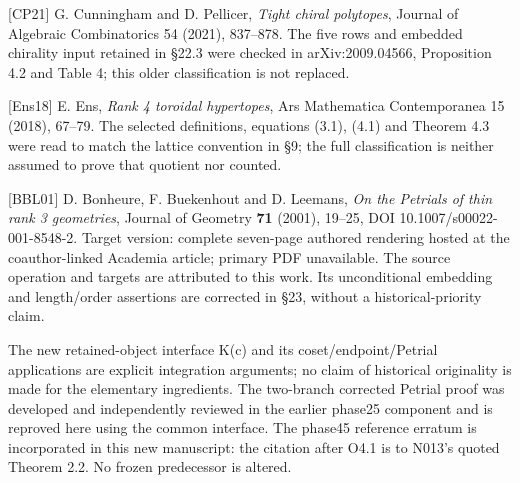 \documentclass[
  10pt,
  letterpaper,
]{article}
\begin{document}
{[}CP21{]} G. Cunningham and D. Pellicer, \emph{Tight chiral polytopes},
Journal of Algebraic Combinatorics 54 (2021), 837--878. The five rows
and embedded chirality input retained in §22.3 were checked in
arXiv:2009.04566, Proposition 4.2 and Table 4; this older classification
is not replaced.

{[}Ens18{]} E. Ens, \emph{Rank 4 toroidal hypertopes}, Ars Mathematica
Contemporanea 15 (2018), 67--79. The selected definitions, equations
(3.1), (4.1) and Theorem 4.3 were read to match the lattice convention
in §9; the full classification is neither assumed to prove that quotient
nor counted.

{[}BBL01{]} D. Bonheure, F. Buekenhout and D. Leemans, \emph{On the
Petrials of thin rank 3 geometries}, Journal of Geometry \textbf{71}
(2001), 19--25, DOI 10.1007/s00022-001-8548-2. Target version: complete
seven-page authored rendering hosted at the coauthor-linked Academia
article; primary PDF unavailable. The source operation and targets are
attributed to this work. Its unconditional embedding and length/order
assertions are corrected in §23, without a historical-priority claim.

The new retained-object interface K(c) and its coset/endpoint/Petrial
applications are explicit integration arguments; no claim of historical
originality is made for the elementary ingredients. The two-branch
corrected Petrial proof was developed and independently reviewed in the
earlier phase25 component and is reproved here using the common
interface. The phase45 reference erratum is incorporated in this new
manuscript: the citation after O4.1 is to N013's quoted Theorem 2.2. No
frozen predecessor is altered.
\end{document}
